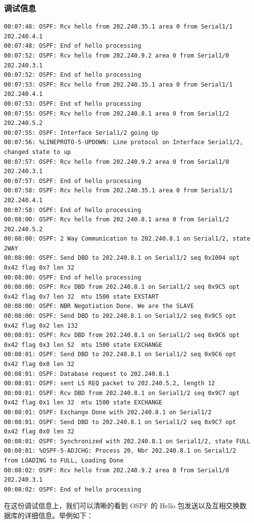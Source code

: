 \documentclass[black,normal,cn]{elegantnote}
\begin{document}
\subsubsection{调试信息}
\begin{lstlisting}
00:07:48: OSPF: Rcv hello from 202.240.35.1 area 0 from Serial1/1 202.240.4.1
00:07:48: OSPF: End of hello processing
00:07:52: OSPF: Rcv hello from 202.240.9.2 area 0 from Serial1/0 202.240.3.1
00:07:52: OSPF: End of hello processing
00:07:53: OSPF: Rcv hello from 202.240.35.1 area 0 from Serial1/1 202.240.4.1
00:07:53: OSPF: End of hello processing
00:07:55: OSPF: Rcv hello from 202.240.8.1 area 0 from Serial1/2 202.240.5.2
00:07:55: OSPF: Interface Serial1/2 going Up
00:07:56: %LINEPROTO-5-UPDOWN: Line protocol on Interface Serial1/2, changed state to up
00:07:57: OSPF: Rcv hello from 202.240.9.2 area 0 from Serial1/0 202.240.3.1
00:07:57: OSPF: End of hello processing
00:07:58: OSPF: Rcv hello from 202.240.35.1 area 0 from Serial1/1 202.240.4.1
00:07:58: OSPF: End of hello processing
00:08:00: OSPF: Rcv hello from 202.240.8.1 area 0 from Serial1/2 202.240.5.2
00:08:00: OSPF: 2 Way Communication to 202.240.8.1 on Serial1/2, state 2WAY
00:08:00: OSPF: Send DBD to 202.240.8.1 on Serial1/2 seq 0x1004 opt 0x42 flag 0x7 len 32
00:08:00: OSPF: End of hello processing
00:08:00: OSPF: Rcv DBD from 202.240.8.1 on Serial1/2 seq 0x9C5 opt 0x42 flag 0x7 len 32  mtu 1500 state EXSTART
00:08:00: OSPF: NBR Negotiation Done. We are the SLAVE
00:08:00: OSPF: Send DBD to 202.240.8.1 on Serial1/2 seq 0x9C5 opt 0x42 flag 0x2 len 132
00:08:01: OSPF: Rcv DBD from 202.240.8.1 on Serial1/2 seq 0x9C6 opt 0x42 flag 0x3 len 52  mtu 1500 state EXCHANGE
00:08:01: OSPF: Send DBD to 202.240.8.1 on Serial1/2 seq 0x9C6 opt 0x42 flag 0x0 len 32
00:08:01: OSPF: Database request to 202.240.8.1
00:08:01: OSPF: sent LS REQ packet to 202.240.5.2, length 12
00:08:01: OSPF: Rcv DBD from 202.240.8.1 on Serial1/2 seq 0x9C7 opt 0x42 flag 0x1 len 32  mtu 1500 state EXCHANGE
00:08:01: OSPF: Exchange Done with 202.240.8.1 on Serial1/2
00:08:01: OSPF: Send DBD to 202.240.8.1 on Serial1/2 seq 0x9C7 opt 0x42 flag 0x0 len 32
00:08:01: OSPF: Synchronized with 202.240.8.1 on Serial1/2, state FULL
00:08:01: %OSPF-5-ADJCHG: Process 20, Nbr 202.240.8.1 on Serial1/2 from LOADING to FULL, Loading Done
00:08:02: OSPF: Rcv hello from 202.240.9.2 area 0 from Serial1/0 202.240.3.1
00:08:02: OSPF: End of hello processing
\end{lstlisting}

在这份调试信息上，我们可以清晰的看到 OSPF 的 Hello 包发送以及互相交换数据库的详细信息。举例如下：
\end{document}
